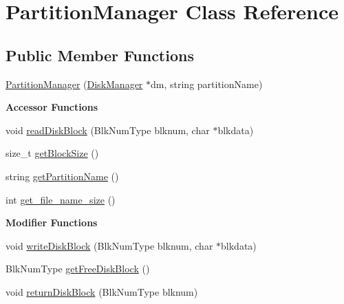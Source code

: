 \hypertarget{classPartitionManager}{}\section{Partition\+Manager Class Reference}
\label{classPartitionManager}
\subsection*{Public Member Functions}
\begin{DoxyCompactItemize}
\item 
\mbox{\hyperlink{classPartitionManager_aa875b0b19b7ab9f32b02d2c9be383b75}{Partition\+Manager}} (\mbox{\hyperlink{classDiskManager}{Disk\+Manager}} $\ast$dm, string partition\+Name)
\end{DoxyCompactItemize}
\begin{Indent}\textbf{ Accessor Functions}\par
\begin{DoxyCompactItemize}
\item 
void \mbox{\hyperlink{classPartitionManager_a7aca34c24770b7b9290c489475655ada}{read\+Disk\+Block}} (Blk\+Num\+Type blknum, char $\ast$blkdata)
\item 
size\+\_\+t \mbox{\hyperlink{classPartitionManager_aa1026e17e77f154d7034fafd188bda02}{get\+Block\+Size}} ()
\item 
string \mbox{\hyperlink{classPartitionManager_a7c756dba2665e5a7b62b2ccb261f1158}{get\+Partition\+Name}} ()
\item 
int \mbox{\hyperlink{classPartitionManager_a3b047c1c63c2f9a9e04805471c04ccf0}{get\+\_\+file\+\_\+name\+\_\+size}} ()
\end{DoxyCompactItemize}
\end{Indent}
\begin{Indent}\textbf{ Modifier Functions}\par
\begin{DoxyCompactItemize}
\item 
void \mbox{\hyperlink{classPartitionManager_a114d5d4f8d90b6e9207b09d99e246bed}{write\+Disk\+Block}} (Blk\+Num\+Type blknum, char $\ast$blkdata)
\item 
Blk\+Num\+Type \mbox{\hyperlink{classPartitionManager_a682ce5963a31cf7009455cb1c229b26a}{get\+Free\+Disk\+Block}} ()
\item 
void \mbox{\hyperlink{classPartitionManager_a3ce9b50aa5e7d9063919fc55d125246b}{return\+Disk\+Block}} (Blk\+Num\+Type blknum)
\end{DoxyCompactItemize}
\end{Indent}


